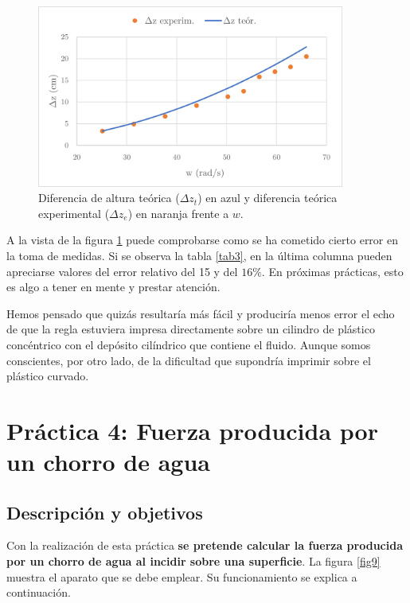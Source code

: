 \documentclass[12pt,a4paper]{article}
\begin{document}
\begin{figure}[H]
 	 \begin{center}
  \includegraphics[width=0.9\textwidth]{fotos/grafico_3}
  	 \end{center}
  	 \vspace{-0.3cm}
  	\caption{Diferencia de altura teórica ($\Delta z_{t}$) en azul y diferencia teórica experimental ($\Delta z_{e}$) en naranja frente a $w$.}
  	\label{fig8}
  	\vspace{-0.2cm}
\end{figure}

A la vista de la figura \ref{fig8} puede comprobarse como se ha cometido cierto error en la toma de medidas. Si se observa la tabla \ref{tab3}, en la última columna pueden apreciarse valores del error relativo del 15 y del $16\%$. En próximas prácticas, esto es algo a tener en mente y prestar atención. 

Hemos pensado que quizás resultaría más fácil y produciría menos error el echo de que la regla estuviera impresa directamente sobre un cilindro de plástico concéntrico con el depósito cilíndrico que contiene el fluido. Aunque somos conscientes, por otro lado, de la dificultad que supondría imprimir  sobre el plástico curvado. 
\newpage
\section*{Práctica 4: Fuerza producida por un chorro de agua}

\subsection*{Descripción y objetivos}
Con la realización de esta práctica \textbf{se pretende calcular la fuerza producida por un chorro de agua al incidir sobre una superficie}. La figura \ref{fig9} muestra el aparato que se debe emplear. Su funcionamiento se explica a continuación.
\end{document}
